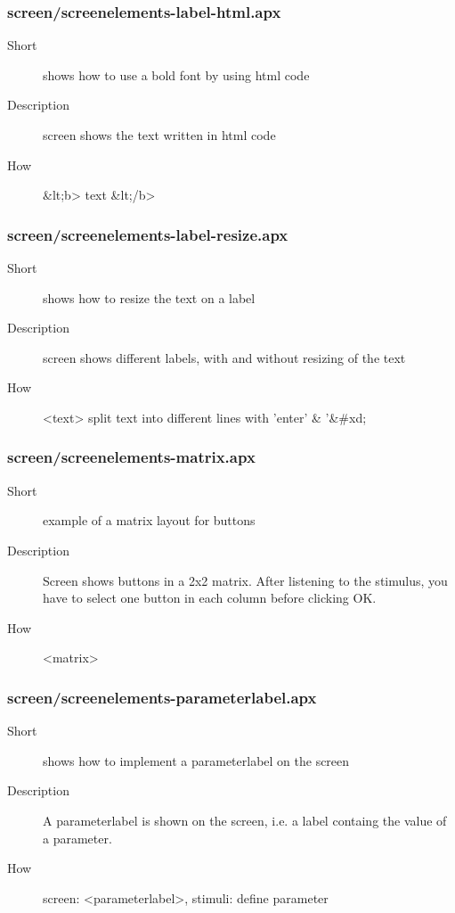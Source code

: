 \subsubsection{screen/screenelements-label-html.apx}
\begin{description}
\item[Short] 
 shows how to use a bold font by using html code
\item[Description] 
 screen shows the text written in html code
\item[How] 
 \&lt;b\textgreater{}  text  \&lt;/b\textgreater{}
\end{description}

\subsubsection{screen/screenelements-label-resize.apx}
\begin{description}
\item[Short] 
 shows how to resize the text on a label
\item[Description] 
 screen shows different labels, with and without resizing of the text
\item[How] 
 \textless{}text\textgreater{} split text into different lines with 'enter' \& '\&\#xd;
\end{description}

\subsubsection{screen/screenelements-matrix.apx}
\begin{description}
\item[Short] 
 example of a matrix layout for buttons
\item[Description] 
 Screen shows buttons in a 2x2 matrix. After listening to the stimulus, you have to select one button in each column before clicking OK.
\item[How] 
 \textless{}matrix\textgreater{}
\end{description}

\subsubsection{screen/screenelements-parameterlabel.apx}
\begin{description}
\item[Short] 
 shows how to implement a parameterlabel on the screen
\item[Description] 
 A parameterlabel is shown on the screen, i.e. a label containg the value of a parameter.
\item[How] 
 screen: \textless{}parameterlabel\textgreater{}, stimuli: define parameter
\end{description}

